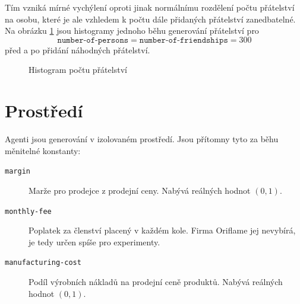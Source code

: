 \documentclass[a4wide,12pt]{report}
\begin{document}
Tím vzniká mírné vychýlení oproti jinak normálnímu rozdělení počtu přátelství na osobu, které je ale vzhledem k počtu dále přidaných přátelství zanedbatelné. Na obrázku \ref{fig:hist_fr} jsou histogramy jednoho běhu generování přátelství pro \[\texttt{number-of-persons}=\texttt{number-of-friendships}=300\] před a po přidání náhodných přátelství.\\
\begin{figure}[h]
  \centering
  \caption{Histogram počtu přátelství}
  \label{fig:hist_fr}
\end{figure}
\section{Prostředí}
Agenti jsou generování v izolovaném prostředí. Jsou přítomny tyto za běhu měnitelné konstanty:
\begin{description}
\item[\texttt{margin}] Marže pro prodejce z prodejní ceny. Nabývá reálných hodnot $(0,1)$.
\item[\texttt{monthly-fee}] Poplatek za členství placený v každém kole. Firma Oriflame jej nevybírá, je tedy určen spíše pro experimenty.
\item[\texttt{manufacturing-cost}] Podíl výrobních nákladů na prodejní ceně produktů. Nabývá reálných hodnot $(0,1)$.
\end{description}
\end{document}
